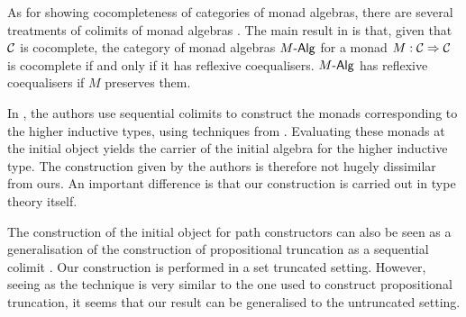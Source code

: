 As for showing cocompleteness of categories of monad algebras, there
are several treatments of colimits of monad algebras
\cite{Linton1969,Barr1985}. The main result in \cite{Linton1969} is
that, given that $\mathcal{C}$ is cocomplete, the category of monad algebras
$\monalgcat{M}$ for a monad $M : \mathcal{C} \Rightarrow \mathcal{C}$ is cocomplete if and
only if it has reflexive coequalisers. $\monalgcat{M}$ has reflexive
coequalisers if $M$ preserves them.

In \cite{Lumsdaine2013}, the authors use sequential colimits to
construct the monads corresponding to the higher inductive types,
using techniques from \cite{Kelly1980}. Evaluating these monads at the
initial object yields the carrier of the initial algebra for the
higher inductive type. The construction given by the authors is
therefore not hugely dissimilar from ours. An important difference is
that our construction is carried out in type theory itself.

The construction of the initial object for path constructors can also
be seen as a generalisation of the construction of propositional
truncation as a sequential colimit \cite{Doorn2016}. Our construction
is performed in a set truncated setting. However, seeing as the
technique is very similar to the one used to construct propositional
truncation, it seems that our result can be generalised to the
untruncated setting.
